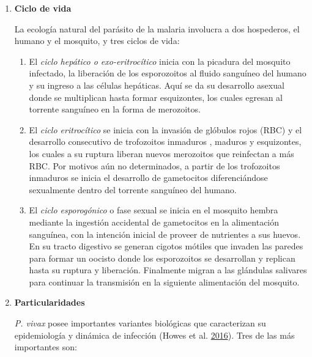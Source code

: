 \documentclass[a4paper]{article}
\providecommand{\tightlist}{%
  \setlength{\itemsep}{0pt}\setlength{\parskip}{0pt}}
\begin{document}
\begin{enumerate}
  \begin{enumerate}
  \def\labelenumii{\roman{enumii}.}
  \item
    \textbf{Ciclo de vida}

    La ecología natural del parásito de la malaria involucra a dos
    hospederos, el humano y el mosquito, y tres ciclos de vida:

    \begin{enumerate}
    \def\labelenumiii{\arabic{enumiii}.}
    \tightlist
    \item
      El \emph{ciclo hepático o exo-eritrocítico} inicia con la picadura
      del mosquito infectado, la liberación de los esporozoitos al
      fluido sanguíneo del humano y su ingreso a las células hepáticas.
      Aquí se da su desarrollo asexual donde se multiplican hasta formar
      esquizontes, los cuales egresan al torrente sanguíneo en la forma
      de merozoitos.
    \item
      El \emph{ciclo eritrocítico} se inicia con la invasión de glóbulos
      rojos (RBC) y el desarrollo consecutivo de trofozoitos inmaduros ,
      maduros y esquizontes, los cuales a su ruptura liberan nuevos
      merozoitos que reinfectan a más RBC. Por motivos aún no
      determinados, a partir de los trofozoitos inmaduros se inicia el
      desarrollo de gametocitos diferenciándose sexualmente dentro del
      torrente sanguíneo del humano.
    \item
      El \emph{ciclo esporogónico} o fase sexual se inicia en el
      mosquito hembra mediante la ingestión accidental de gametocitos en
      la alimentación sanguínea, con la intención inicial de proveer de
      nutrientes a sus huevos. En su tracto digestivo se generan cigotos
      mótiles que invaden las paredes para formar un oocisto donde los
      esporozoitos se desarrollan y replican hasta su ruptura y
      liberación. Finalmente migran a las glándulas salivares para
      continuar la transmisión en la siguiente alimentación del
      mosquito.
    \end{enumerate}
  \item
    \textbf{Particularidades}

    \emph{P. vivax} posee importantes variantes biológicas que
    caracterizan su epidemiología y dinámica de infección (Howes et al.
    \protect\hyperlink{ref-howes2016global}{2016}). Tres de las más
    importantes son:


\end{enumerate}
\end{enumerate}
\end{document}
